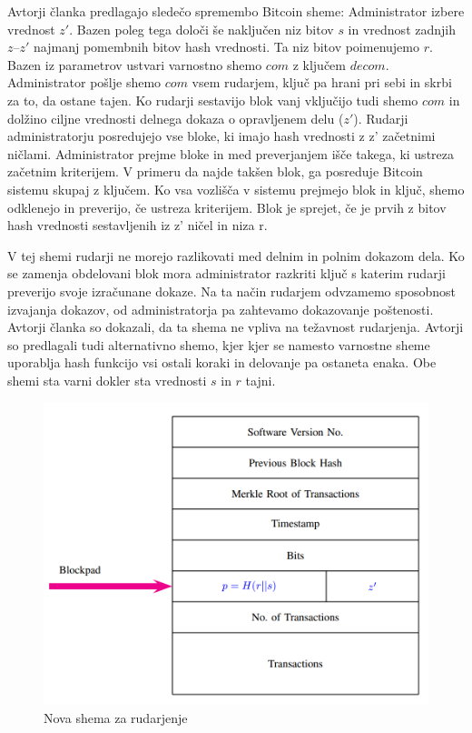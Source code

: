 \documentclass{acm_proc_article-sp}
\begin{document}
Avtorji članka predlagajo sledečo spremembo Bitcoin sheme:
Administrator izbere vrednost $z'$. Bazen poleg tega določi še naključen niz bitov $s$ in vrednost zadnjih $z – z'$ najmanj pomembnih bitov hash vrednosti. Ta niz bitov poimenujemo $r$.
Bazen iz parametrov ustvari varnostno shemo $com$ z ključem $decom$. Administrator pošlje shemo $com$ vsem rudarjem, ključ pa hrani pri sebi in skrbi za to, da ostane tajen. Ko rudarji sestavijo blok vanj vključijo tudi shemo $com$ in dolžino ciljne vrednosti delnega dokaza o opravljenem delu ($z'$). Rudarji administratorju posredujejo vse bloke, ki imajo hash vrednosti z z' začetnimi ničlami. Administrator prejme bloke in med preverjanjem išče takega, ki ustreza začetnim kriterijem. V primeru da najde takšen blok, ga posreduje Bitcoin sistemu skupaj z ključem. Ko vsa vozlišča v sistemu prejmejo blok in ključ, shemo odklenejo in preverijo, če ustreza kriterijem. Blok je sprejet, če je prvih z bitov hash vrednosti sestavljenih iz z' ničel in niza r.
 
V tej shemi rudarji ne morejo razlikovati med delnim in polnim dokazom dela. Ko se zamenja obdelovani blok mora administrator razkriti ključ s katerim rudarji preverijo svoje izračunane dokaze. Na ta način rudarjem odvzamemo sposobnost izvajanja dokazov, od administratorja pa zahtevamo dokazovanje poštenosti. Avtorji članka so dokazali, da ta shema ne vpliva na težavnost rudarjenja. Avtorji so predlagali tudi alternativno shemo, kjer kjer se namesto varnostne sheme uporablja hash funkcijo vsi ostali koraki in delovanje pa ostaneta enaka. Obe shemi sta varni dokler sta vrednosti $s$ in $r$ tajni.

\begin{figure}
  \includegraphics[scale=0.30]{image10.png}
  \caption{Nova shema za rudarjenje}
  \label{fig:boat3}
\end{figure}
\end{document}
